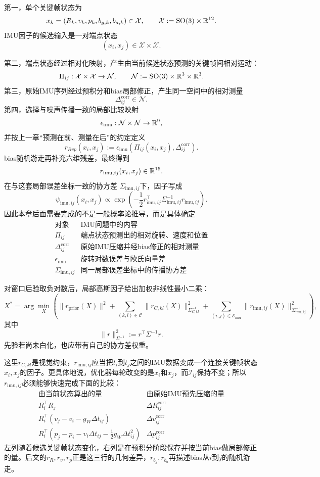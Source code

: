 第一，单个关键帧状态为
\[
    x_k=(R_k,v_k,p_k,b_{g,k},b_{a,k})
    \in\mathcal X,
    \qquad
    \mathcal X:=\operatorname{SO}(3)\times\mathbb{R}^{12}.
\]
IMU因子的候选输入是一对端点状态
\[
    (x_i,x_j)\in\mathcal X\times\mathcal X.
\]

第二，端点状态经过相对化映射，产生由当前候选状态预测的关键帧间相对运动：
\[
    \Pi_{ij}:
    \mathcal X\times\mathcal X\to\mathcal N,
    \qquad
    \mathcal N:=\operatorname{SO}(3)\times\mathbb{R}^3\times\mathbb{R}^3.
\]
第三，原始IMU序列经过预积分和bias局部修正，产生同一空间中的相对测量
\[
    \Delta_{ij}^{\mathrm{corr}}
    \in\mathcal N.
\]
第四，选择与噪声传播一致的局部比较映射
\[
    \epsilon_{\mathrm{imu}}:
    \mathcal N\times\mathcal N\to\mathbb{R}^9,
\]
并按上一章“预测在前、测量在后”的约定定义
\[
\boxed{
    r_{Rvp}(x_i,x_j)
    :=
    \epsilon_{\mathrm{imu}}\left(
      \Pi_{ij}(x_i,x_j),
      \Delta_{ij}^{\mathrm{corr}}
    \right).
}
\]
bias随机游走再补充六维残差，最终得到
\[
    r_{\mathrm{imu},ij}(x_i,x_j)\in\mathbb{R}^{15}.
\]
在与这套局部误差坐标一致的协方差
\(\Sigma_{\mathrm{imu},ij}\)下，因子写成
\[
    \psi_{\mathrm{imu},ij}(x_i,x_j)
    \propto
    \exp\left(
      -\frac12
      r_{\mathrm{imu},ij}^\top
      \Sigma_{\mathrm{imu},ij}^{-1}
      r_{\mathrm{imu},ij}
    \right).
\]
因此本章后面需要完成的不是一般概率论推导，而是具体确定
\[
\boxed{
\begin{array}{c|c}
\text{对象} & \text{IMU问题中的内容}\\ \hline
\Pi_{ij} & \text{端点状态预测出的相对旋转、速度和位置}\\
\Delta_{ij}^{\mathrm{corr}} & \text{原始IMU压缩并经bias修正的相对测量}\\
\epsilon_{\mathrm{imu}} & \text{旋转对数误差与欧氏向量差}\\
\Sigma_{\mathrm{imu},ij} & \text{同一局部误差坐标中的传播协方差}
\end{array}
}
\]

对窗口后验取负对数后，局部高斯因子给出加权非线性最小二乘：
\[
\boxed{
    X^*
    =\arg\min_X
    \left(
      \|r_{\mathrm{prior}}(X)\|^2
      +\sum_{(k,l)\in\mathcal C}
       \|r_{C,kl}(X)\|_{\Sigma_{C,kl}^{-1}}^2
      +\sum_{(i,j)\in\mathcal E_{\mathrm{imu}}}
       \|r_{\mathrm{imu},ij}(X)\|_{\Sigma_{\mathrm{imu},ij}^{-1}}^2
    \right),
}
\]
其中
\[
    \|r\|_{\Sigma^{-1}}^2
    :=r^\top\Sigma^{-1}r.
\]
先验若尚未白化，也应带有自己的协方差权重。

这里$r_{C,kl}$是视觉约束，$r_{\mathrm{imu},ij}$应当把$t_i$到$t_j$之间的IMU数据变成一个连接关键帧状态$x_i,x_j$的因子。更具体地说，优化器每轮改变的是$x_i$和$x_j$，而$\mathcal I_{ij}$保持不变；所以$r_{\mathrm{imu},ij}$必须能够快速完成下面的比较：
\[
\begin{array}{c|c}
\text{由当前状态算出的量} & \text{由原始IMU预先压缩的量}\\ \hline
R_i^\top R_j & \Delta R_{ij}^{\mathrm{corr}}\\
R_i^\top(v_j-v_i-g_W\Delta t_{ij}) & \Delta v_{ij}^{\mathrm{corr}}\\
R_i^\top\left(p_j-p_i-v_i\Delta t_{ij}
  -\frac12g_W\Delta t_{ij}^2\right) & \Delta p_{ij}^{\mathrm{corr}}
\end{array}
\]
左列随着候选关键帧状态变化，右列是在预积分阶段保存并按当前bias做局部修正的量。后文的$r_R,r_v,r_p$正是这三行的几何差异，$r_{b_g},r_{b_a}$再描述bias从$i$到$j$的随机游走。

